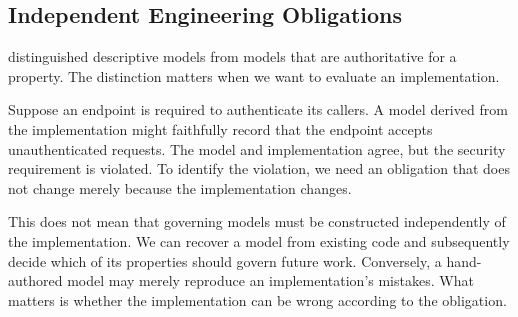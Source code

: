 
\subsection{Independent Engineering Obligations}\label{heading:independent-engineering-obligations}

 distinguished descriptive models from models that are authoritative for a property. The distinction matters when we want to evaluate an implementation.

Suppose an endpoint is required to authenticate its callers. A model derived from the implementation might faithfully record that the endpoint accepts unauthenticated requests. The model and implementation agree, but the security requirement is violated. To identify the violation, we need an obligation that does not change merely because the implementation changes.

This does not mean that governing models must be constructed independently of the implementation. We can recover a model from existing code and subsequently decide which of its properties should govern future work. Conversely, a hand-authored model may merely reproduce an implementation's mistakes. What matters is whether the implementation can be wrong according to the obligation.

